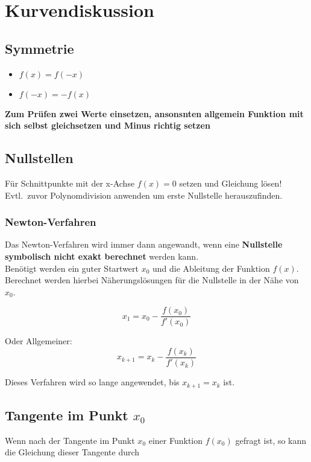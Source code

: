 \documentclass[12pt, a4paper]{scrreprt}
\begin{document}
\chapter{Kurvendiskussion}

\section{Symmetrie}

\begin{itemize}
\item {} \(f(x) = f(-x)\)
\item {} \(f(-x) = -f(x)\)
\end{itemize}

\textbf{Zum Prüfen zwei Werte einsetzen, ansonsnten allgemein Funktion mit sich selbst gleichsetzen und Minus richtig setzen}


\section{Nullstellen}
Für Schnittpunkte mit der x-Achse \(f(x)=0\) setzen und Gleichung lösen!\\
Evtl.\ zuvor Polynomdivision anwenden um erste Nullstelle herauszufinden.

\subsection{Newton-Verfahren}

Das Newton-Verfahren wird immer dann angewandt, wenn eine \textbf{Nullstelle symbolisch nicht exakt berechnet} werden kann.\\
Benötigt werden ein guter Startwert \(x_0\) und die Ableitung der Funktion \(f(x)\). Berechnet werden hierbei Näherungslösungen für die Nullstelle in der Nähe von \(x_0\).

\[
  x_1 = x_0 - \frac{f(x_0)}{f'(x_0)}
\]

Oder Allgemeiner:
\[
  x_{k+1} = x_k - \frac{f(x_k)}{f'(x_k)}
\]

Dieses Verfahren wird so lange angewendet, bis \(x_{k+1} = x_k\) ist.

\section{Tangente im Punkt \(x_0\)}
Wenn nach der Tangente im Punkt \(x_0\) einer Funktion \(f(x_0)\) gefragt ist, so kann die Gleichung dieser Tangente durch
\end{document}
